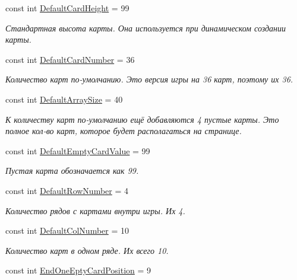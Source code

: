 \begin{DoxyCompactItemize}
const int \hyperlink{class_pasyans_cover_u_w_p_1_1_game_page_a5458c54c117e7ff5f98235839e596943}{Default\+Card\+Height} = 99
\begin{DoxyCompactList}\small\item\em Стандартная высота карты. Она используется при динамическом создании карты. \end{DoxyCompactList}\item 
const int \hyperlink{class_pasyans_cover_u_w_p_1_1_game_page_a44897cf4110fd61d040588f182178def}{Default\+Card\+Number} = 36
\begin{DoxyCompactList}\small\item\em Количество карт по-\/умолчанию. Это версия игры на 36 карт, поэтому их 36. \end{DoxyCompactList}\item 
const int \hyperlink{class_pasyans_cover_u_w_p_1_1_game_page_af512b41a55021eba0dafb53dac089916}{Default\+Array\+Size} = 40
\begin{DoxyCompactList}\small\item\em К количеству карт по-\/умолчанию ещё добавляются 4 пустые карты. Это полное кол-\/во карт, которое будет располагаться на странице. \end{DoxyCompactList}\item 
const int \hyperlink{class_pasyans_cover_u_w_p_1_1_game_page_a2274460b85cbcd4a6d15edbf55a7b1d0}{Default\+Empty\+Card\+Value} = 99
\begin{DoxyCompactList}\small\item\em Пустая карта обозначается как 99. \end{DoxyCompactList}\item 
const int \hyperlink{class_pasyans_cover_u_w_p_1_1_game_page_ab7c545b8afa290af58491cbcdd2c785f}{Default\+Row\+Number} = 4
\begin{DoxyCompactList}\small\item\em Количество рядов с картами внутри игры. Их 4. \end{DoxyCompactList}\item 
const int \hyperlink{class_pasyans_cover_u_w_p_1_1_game_page_aa3cf4f53575e93818fffbdf3c04384ed}{Default\+Col\+Number} = 10
\begin{DoxyCompactList}\small\item\em Количество карт в одном ряде. Их всего 10. \end{DoxyCompactList}\item 
const int \hyperlink{class_pasyans_cover_u_w_p_1_1_game_page_ab5e0a4bb6c6e77d8f725182748803fc7}{End\+One\+Epty\+Card\+Position} = 9

\end{DoxyCompactItemize}
